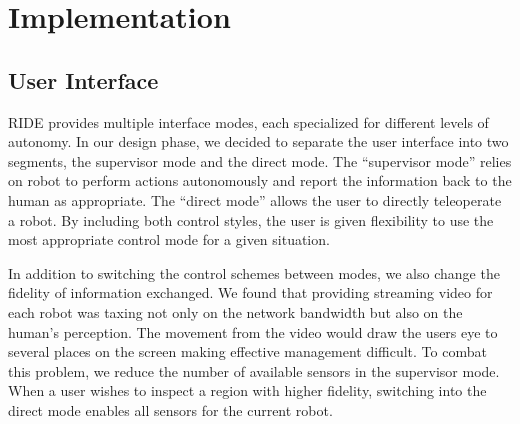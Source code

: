 \chapter{Implementation}





\section{User Interface}
\label{sec:ride_user_interface}

RIDE provides multiple interface modes, each specialized for different levels of autonomy. In our design phase, we decided to separate the user interface into two segments, the supervisor mode and the direct mode. The ``supervisor mode'' relies on robot to perform actions autonomously and report the information back to the human as appropriate. The ``direct mode'' allows the user to directly teleoperate a robot. By including both control styles, the user is given flexibility to use the most appropriate control mode for a given situation.

In addition to switching the control schemes between modes, we also change the fidelity of information exchanged. We found that providing streaming video for each robot was taxing not only on the network bandwidth but also on the human's perception. The movement from the video would draw the users eye to several places on the screen making effective management difficult. To combat this problem, we reduce the number of available sensors in the supervisor mode. When a user wishes to inspect a region with higher fidelity, switching into the direct mode enables all sensors for the current robot.


